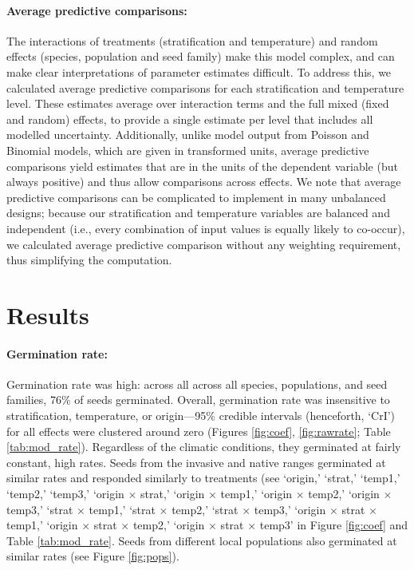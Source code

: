 \documentclass[12pt]{article}\usepackage[]{graphicx}\usepackage[]{color}
\begin{document}
	\paragraph{Average predictive comparisons:} The interactions of treatments (stratification and temperature) and random effects (species, population and seed family) make this model complex, and can make clear interpretations of parameter estimates difficult. To address this, we calculated average predictive comparisons \parencite{Gelman2007} for each stratification and  temperature level. These estimates average over interaction terms and the full mixed (fixed and random) effects, to provide a single estimate per level that includes all modelled uncertainty. Additionally, unlike model output from Poisson and Binomial models, which are given in transformed units, average predictive comparisons yield estimates that are in the units of the dependent variable (but always positive) \parencite{Gelman2007} and thus allow comparisons across effects. We note that average predictive comparisons can be complicated to implement in many unbalanced designs; because our stratification and temperature variables are balanced and independent (i.e., every combination of input values is equally likely to co-occur), we calculated average predictive comparison without any weighting requirement, thus simplifying the computation. 
	

	\section{Results} 
	\paragraph{Germination rate:} Germination rate was high: across all across all species, populations, and seed families, 76\% of seeds germinated. Overall, germination rate was insensitive to stratification, temperature, or origin---95\% credible intervals (henceforth, `CrI') for all effects were clustered around zero (Figures \ref{fig:coef}, \ref{fig:rawrate}; Table \ref{tab:mod_rate}). Regardless of the climatic conditions, they germinated at fairly constant, high rates. Seeds from the invasive and native ranges germinated at similar rates and responded similarly to treatments (see `origin,' `strat,' `temp1,' `temp2,' `temp3,' `origin $\times$ strat,' `origin $\times$ temp1,' `origin $\times$ temp2,' `origin $\times$ temp3,' `strat $\times$ temp1,' `strat $\times$ temp2,' `strat $\times$ temp3,' `origin $\times$ strat $\times$ temp1,' `origin $\times$ strat $\times$ temp2,' `origin $\times$ strat $\times$ temp3' in Figure \ref{fig:coef} and Table \ref{tab:mod_rate}. Seeds from different local populations also germinated at similar rates (see Figure \ref{fig:pops}).
\end{document}
